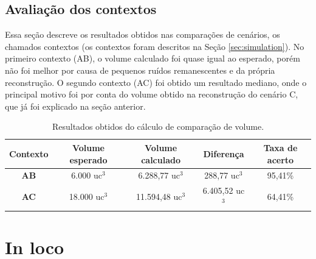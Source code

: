 \subsection{Avaliação dos contextos}
\label{sec:avaliacao_contextos}

Essa seção descreve os resultados obtidos nas comparações de cenários, os chamados contextos (os contextos foram descritos na Seção \ref{sec:simulation}).
No primeiro contexto (AB), o volume calculado foi quase igual ao esperado, porém não foi melhor por causa de pequenos ruídos remanescentes e da própria reconstrução.
O segundo contexto (AC) foi obtido um resultado mediano, onde o principal motivo foi por conta do volume obtido na reconstrução do cenário C, que já foi explicado na seção anterior. 

\begin{table}[H]
    \centering
    \caption{Resultados obtidos do cálculo de comparação de volume.}
    \begin{tabular}{ccccc}
        \toprule
        \textbf{Contexto} & \textbf{Volume esperado} & \textbf{Volume calculado} & \textbf{Diferença} & \textbf{Taxa de acerto} \\ \midrule
        \textbf{AB} & 6.000 uc$^3$ & 6.288,77 uc$^3$ & 288,77 uc$^3$ & 95,41\% \\
        \textbf{AC} & 18.000 uc$^3$ & 11.594,48 uc$^3$ & 6.405,52 uc$^3$ & 64,41\% \\ \bottomrule
    \end{tabular}
    \label{tab:tabela_resultados_contextos}
\end{table}


\section{In loco}
